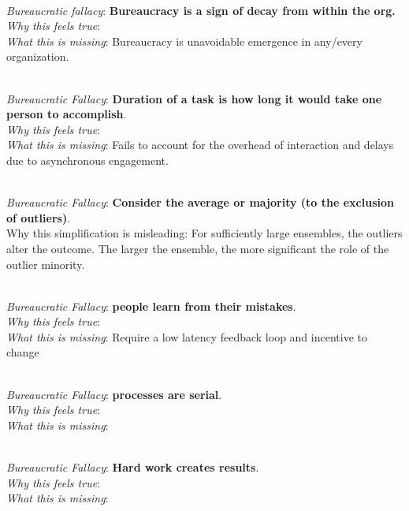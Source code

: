 \ \\

\textit{Bureaucratic fallacy}: \textbf{Bureaucracy is a sign of decay from within the org.} \\
\textit{Why this feels true}: \\
\textit{What this is missing}: Bureaucracy is unavoidable emergence in any/every organization.

\ \\

\textit{Bureaucratic Fallacy}: \textbf{Duration of a task is how long it would take one person to accomplish}.  \\
\textit{Why this feels true}: \\
\textit{What this is missing}: Fails to account for the overhead of interaction and delays due to asynchronous engagement.


\ \\

\textit{Bureaucratic Fallacy}: \textbf{Consider the average or majority (to the exclusion of outliers)}. \\
Why this simplification is misleading: For sufficiently large ensembles, the outliers alter the outcome. The larger the ensemble, the more significant the role of the outlier minority.

\ \\

\textit{Bureaucratic Fallacy}: \textbf{people learn from their mistakes}. \\
\textit{Why this feels true}: \\
\textit{What this is missing}: Require a low latency feedback loop and incentive to change

\ \\

\textit{Bureaucratic Fallacy}: \textbf{processes are serial}.\\
\textit{Why this feels true}: \\
\textit{What this is missing}: 


\ \\

\textit{Bureaucratic Fallacy}: 
\textbf{Hard work creates results}.\\
\textit{Why this feels true}: \\
\textit{What this is missing}: 


\ \\

